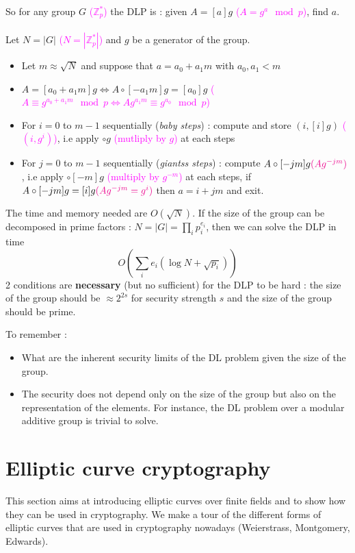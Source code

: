 \documentclass[11pt,a4paper]{report}
\begin{document}
So for any group $G$ \textcolor{magenta}{($\mathbb{Z}_p^*$)} the DLP is : given $A = [a]g$ \textcolor{magenta}{($A = g^a \mod p$)}, find $a$.\\
\\
Let $N = |G|$ \textcolor{magenta}{($N = |\mathbb{Z}_p^* |$)} and $g$ be a generator of the group.
\begin{itemize}
\item Let $m \approx \sqrt{N}$ and suppose that $a = a_0+a_1 m$ with $a_0 , a_1 < m$
\item $A = [a_0 + a_1 m]g \Leftrightarrow A \circ [-a_1 m]g = [a_0]g$ \textcolor{magenta}{($A \equiv g^{a_0 + a_1 m} \mod p \Leftrightarrow A g^{a_1 m} \equiv g^{a_0} \mod p$)}
\item For $i=0$ to $m-1$ sequentially (\emph{baby steps}) : compute and store $(i,[i]g)$ \textcolor{magenta}{($(i,g^i)$)}, i.e apply $\circ g$ \textcolor{magenta}{(mutliply by $g$)} at each steps
\item For $j = 0$ to $m-1$ sequentially (\emph{giantss steps}) : compute $A \circ [-jm]g \textcolor{magenta}{(Ag^{-jm})}$, i.e apply $\circ [-m]g$ \textcolor{magenta}{(multiply by $g^{-m}$)} at each steps, if $A \circ [-jm]g = [i]g \textcolor{magenta}{(A g^{-jm} = g^i)} $ then $a = i+jm$ and exit.
\end{itemize}
The time and memory needed are $O(\sqrt{N})$. If the size of the group can be decomposed in prime factors : $N = |G| = \prod\limits_i p_i^{e_i}$, then we can solve the DLP in time
$$O\left( \sum\limits_i e_i (\log N + \sqrt{p_i}) \right)$$
2 conditions are \textbf{necessary} (but no sufficient) for the DLP to be hard : the size of the group should be $\approx 2^{2s}$ for security strength $s$ and the size of the group should be prime.


To remember :
\begin{itemize}
\item What are the inherent security limits of the DL problem given the size of the group.
\item The security does not depend only on the size of the group but also on the representation of the elements. For instance, the DL problem over a modular additive group is trivial to solve.
\end{itemize}

\section{Elliptic curve cryptography}
This section aims at introducing elliptic curves over finite fields and to show how they can be used in cryptography. We make a tour of the different forms of elliptic curves that are used in cryptography nowadays (Weierstrass, Montgomery, Edwards).
\end{document}
